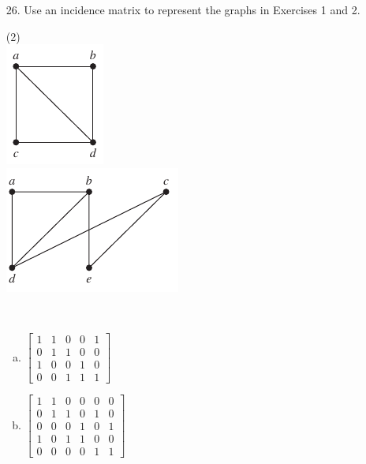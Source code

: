 \begin{itemize}
      \item[26.]  Use an incidence matrix to represent the graphs in Exercises 1 and 2.
            \begin{tasks}(2)
                  \task \text{}\\
                  \includegraphics[scale = 0.7]{img/10_3_1_graph.png}
                  \task \text{}\\
                  \includegraphics[scale = 0.7]{img/10_3_2_graph.png}
            \end{tasks}
            \answer \\
            \begin{enumerate}[a.]
                  \item $
                              \begin{bmatrix}
                                    1 & 1 & 0 & 0 & 1 \\
                                    0 & 1 & 1 & 0 & 0 \\
                                    1 & 0 & 0 & 1 & 0 \\
                                    0 & 0 & 1 & 1 & 1
                              \end{bmatrix}
                        $
                  \item $
                              \begin{bmatrix}
                                    1 & 1 & 0 & 0 & 0 & 0 \\
                                    0 & 1 & 1 & 0 & 1 & 0 \\
                                    0 & 0 & 0 & 1 & 0 & 1 \\
                                    1 & 0 & 1 & 1 & 0 & 0 \\
                                    0 & 0 & 0 & 0 & 1 & 1
                              \end{bmatrix}
                        $
            \end{enumerate}
\end{itemize}
